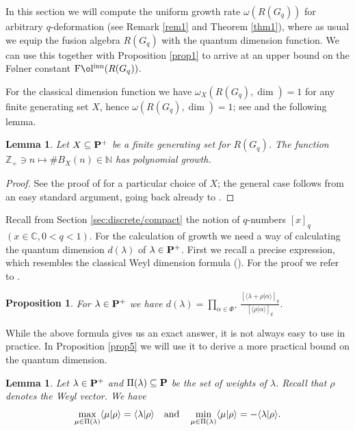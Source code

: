\documentclass[11 pt, leqno]{amsart}
\newcommand{\la}{\langle}
\newcommand{\ra}{\rangle}
\newcommand{\NN}{\mathbb{N}}
\newcommand{\CC}{\mathbb{C}}
\newcommand{\ZZ}{\mathbb{Z}}
\DeclareMathOperator{\Folinn}{F\mathrm{\o}l^{inn}}
\newtheorem{proposition}[theorem]{Proposition}
\newtheorem{lemma}[theorem]{Lemma}
\theoremstyle{definition}
\numberwithin{equation}{section}
\begin{document}
In this section we will compute the uniform growth rate $\omega(R(G_q))$ for arbitrary $q$-deformation (see Remark \ref{rem1} and Theorem \ref{thm1}), where as usual we equip the fusion algebra $R(G_q)$ with the quantum dimension function.  We can use this together with Proposition \ref{prop1} to arrive at an upper bound on the F{\o}lner constant $\Folinn(R(G_q))$. 

For the classical dimension function we have $\omega_X(R(G_q),\dim)=1$ for any finite generating set $X$, hence $\omega(R(G_q),\dim)=1$; see \cite[Theorem 2.1]{BanicaVergnioux} and the following lemma. 

\begin{lemma}\label{lemma4}
Let $X\subseteq \bf{P}^+$ be a finite generating set for $R(G_q)$. The function $\ZZ_+\ni n\mapsto \# B_X(n)\in \NN$ has polynomial growth.
\end{lemma}

\begin{proof}
See the proof of \cite[Theorem 2.1]{BanicaVergnioux} for a particular choice of $X$; the general case follows from an easy standard argument, going back already to \cite[Lemma 1]{Milnor}.
\end{proof}

Recall from Section \ref{sec:discrete/compact} the notion of $q$-numbers $[x]_q$ %
$(x\in \CC,0<q<1)$. For the calculation of growth we need a way of calculating the quantum dimension $d(\lambda)$ of $\lambda\in \bf{P}^+$. First we recall a precise expression, which resembles the classical Weyl dimension formula (\cite[Theorem 22.4]{Bump}). For the proof we refer to \cite[Lemma 1]{ZhangGouldBracken}.

\begin{proposition} \label{prop6}
For $\lambda\in {\bf{P}}^+$ we have $d (\lambda)=\prod_{\alpha\in\Phi^+}\frac{ [\la \lambda+\rho |\alpha\ra ]_q}{[\la\rho|\alpha\ra ]_q}$.
\end{proposition}

While the above formula  gives us an exact answer, it is not always easy to use in practice. In Proposition \ref{prop5} we will use it to derive a more practical bound on the quantum dimension.

\begin{lemma}\label{lemma6}
Let $\lambda\in {\bf{P}^+}$ and $\Pi(\lambda)\subseteq \bf{P}$ be the set of weights of $\lambda$. Recall that $\rho$ denotes the Weyl vector. We have
\[
\max_{\mu\in \Pi(\lambda)} \la \mu|\rho\ra=\la \lambda|\rho\ra \quad\textnormal{and}\quad
 \min_{\mu\in \Pi(\lambda)} \la \mu|\rho\ra=-\la \lambda|\rho\ra .
\]
\end{lemma}
\end{document}
